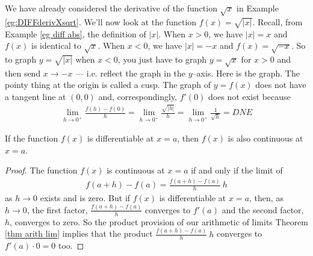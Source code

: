 \begin{eg}\label{eg:DIFFderivCusp}
We have already considered the derivative of the function
$\sqrt{x}$ in Example \ref{eg:DIFFderivXsqrt}.
We'll now look at the function $f(x) = \sqrt{|x|}$.
Recall, from Example \ref{eg diff abs}, the definition of $|x|$.
When $x>0$, we have $|x|=x$ and $f(x)$ is identical to $\sqrt{x}$.
When $x<0$, we have $|x|=-x$ and $f(x)=\sqrt{-x}$. So to graph
$y=\sqrt{|x|}$ when $x<0$, you just have to graph $y=\sqrt{x}$
for $x>0$ and then send $x\rightarrow -x$ --- i.e. reflect the
graph in the $y$--axis. Here is the graph.
The pointy thing at the origin is called a cusp. The graph of
$y=f(x)$ does not have a tangent line at $(0,0)$ and, correspondingly,
$f'(0)$ does not exist because
\begin{align*}
\lim_{h\rightarrow 0^+}\frac{f(h)-f(0)}{h}
 =\lim_{h\rightarrow 0^+}\frac{\sqrt{|h|}}{h}
 =\lim_{h\rightarrow 0^+}\frac{1}{\sqrt{h}}
 =DNE
\end{align*}
\end{eg}

\begin{theorem}\label{thm:DIFFdiffGivesCont}
If the function $f(x)$ is differentiable at $x=a$, then $f(x)$ is also continuous at $x=a$.
\end{theorem}
\begin{proof}
The function $f(x)$ is continuous at $x=a$ if and only if the limit of
\begin{align*}
f(a+h) - f(a) = \frac{f(a+h)-f(a)}{h}\ h
\end{align*}
as $h\rightarrow 0$ exists and is zero. But if $f(x)$ is differentiable at $x=a$, then,
as $h\rightarrow 0$,  the first factor, $ \frac{f(a+h)-f(a)}{h}$ converges to $f'(a)$
and the second factor, $h$, converges to zero. So the product provision of our
arithmetic of limits Theorem \ref{thm arith lim} implies that the product
$\frac{f(a+h)-f(a)}{h}\ h$ converges to $f'(a)\cdot 0=0$ too.
\end{proof}

